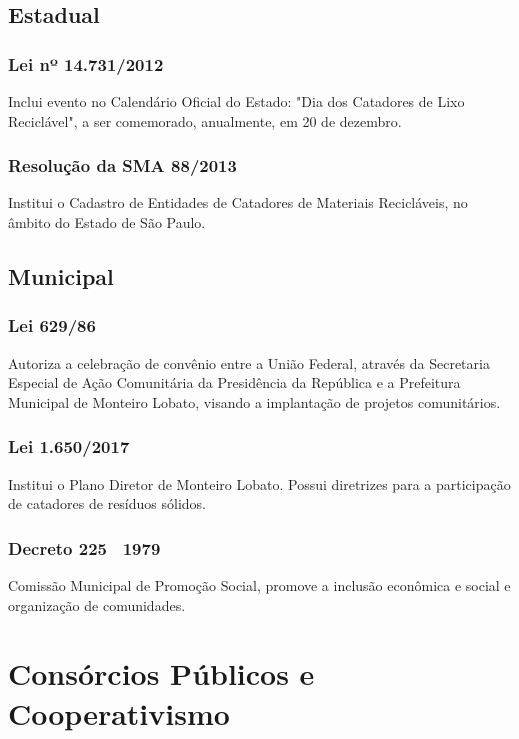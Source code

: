 \begin{subapend}
	\subsection{Estadual}
	\begin{subsubapend}
		\item \subsubsection{Lei nº 14.731/2012}
		Inclui evento no Calendário Oficial do Estado: "Dia dos Catadores de Lixo Reciclável", a ser comemorado, anualmente, em 20 de dezembro.
		\subsubsection{Resolução da SMA 88/2013}
		Institui o Cadastro de Entidades de Catadores de Materiais Recicláveis, no âmbito do Estado de São Paulo.
		\subsection{Municipal}
		\subsubsection{Lei 629/86}
		Autoriza a celebração de convênio entre a União Federal, através da Secretaria Especial de Ação Comunitária da Presidência da República e a Prefeitura Municipal de Monteiro Lobato, visando a implantação de projetos comunitários.
		\subsubsection{Lei 1.650/2017}
		Institui o Plano Diretor de Monteiro Lobato. Possui diretrizes para a participação de catadores de resíduos sólidos.
		\subsubsection{Decreto 225 \ 1979}
		Comissão Municipal de Promoção Social, promove a inclusão econômica e social e organização de comunidades.
	\end{subsubapend}
\end{subapend}

\section{Consórcios Públicos e Cooperativismo}

